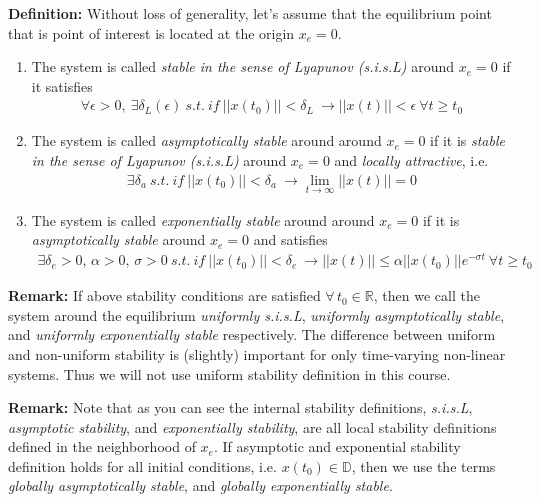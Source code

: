 \documentclass[twoside]{article}
\begin{document}
\textbf{Definition:} Without loss of generality, let's assume that the equilibrium point that is point of interest is located at the origin $x_e = 0$.
%
\begin{enumerate}
%
\item The system is called \textit{stable in the sense of Lyapunov (s.i.s.L)} around $x_e = 0$ if it satisfies
%
\begin{align*}
	\forall \epsilon > 0 , \ \exists \delta_L(\epsilon) \ s.t. \ if \ || x(t_0) || < \delta_L \ \rightarrow || x(t) || < \epsilon \ \forall t \geq t_0
\end{align*}
%
\item The system is called \textit{asymptotically stable} around  around $x_e = 0$ if it is 
\textit{stable in the sense of Lyapunov (s.i.s.L)} around $x_e = 0$ and \textit{locally attractive}, i.e.
%
\begin{align*}
	\exists \delta_a \ s.t. \ if \ || x(t_0) || < \delta_a \ \rightarrow \lim_{t \to \infty} || x(t) || = 0
\end{align*}
%
\item The system is called \textit{exponentially stable} around  around $x_e = 0$ if it is 
\textit{asymptotically stable} around $x_e = 0$ and satisfies 
%
\begin{align*}
	\exists \delta_e > 0 , \, \alpha > 0 , \, \sigma >0 \ s.t. \ if \ || x(t_0) || < \delta_e \ \rightarrow || x(t) || \leq \alpha || x(t_0) || e^{- \sigma t} \ \forall t \geq t_0
\end{align*}
%
\end{enumerate}

\textbf{Remark:} If above stability conditions are satisfied $\forall \, t_0 \in \mathbb{R}$, then we call the system around the equilibrium \textit{uniformly s.i.s.L}, 
\textit{uniformly asymptotically stable}, and \textit{uniformly exponentially stable} respectively. The difference between uniform and non-uniform
stability is (slightly) important for only time-varying non-linear systems. Thus we will not use uniform stability definition in this course. 

\textbf{Remark:} Note that as you can see the internal stability
definitions, \textit{s.i.s.L}, \textit{asymptotic stability}, and
\textit{exponentially stability}, are all local stability definitions
defined in the neighborhood of $x_e$. If asymptotic and exponential stability definition holds
for all initial conditions, i.e. $x(t_0) \in \mathbb{D}$, then we use the terms
\textit{globally asymptotically stable}, and \textit{globally exponentially stable}.
\end{document}
